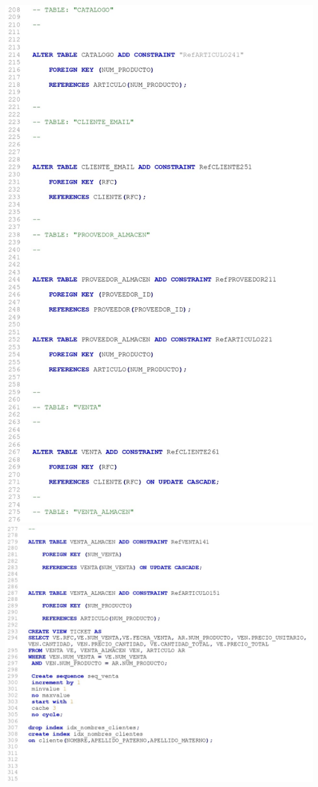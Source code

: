 \documentclass[letter,12pt]{article} %
\begin{document}
\includegraphics[scale=0.85]{imagenes/DDL4.jpg}
\newpage
\includegraphics[scale=0.85]{imagenes/DDL5.jpg}
\end{document}
